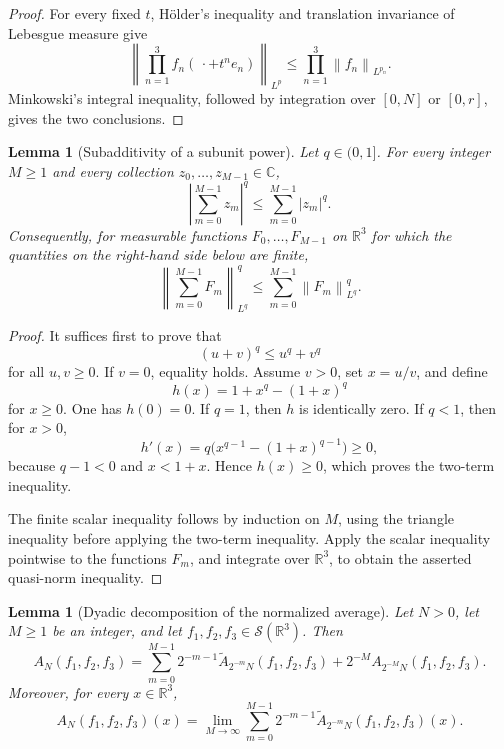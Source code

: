 \documentclass[11pt]{article}
\newtheorem{lemma}[theorem]{Lemma}
\newcommand{\R}{\mathbb{R}}
\newcommand{\Cplx}{\mathbb{C}}
\newcommand{\Sch}{\mathcal{S}}
\newcommand{\norm}[2]{\left\lVert #1\right\rVert_{#2}}
\newcommand{\abs}[1]{\left|#1\right|}
\begin{document}
	\begin{proof}
		For every fixed \(t\), H\"older's inequality and translation invariance of Lebesgue measure give
		\[
		\norm{\prod_{n=1}^{3}f_n(\,\cdot+t^n e_n)}{L^p}
		\leq
		\prod_{n=1}^{3}\norm{f_n}{L^{p_n}}.
		\]
		Minkowski's integral inequality, followed by integration over \([0,N]\) or \([0,r]\), gives the two conclusions.
	\end{proof}
	
	\begin{lemma}[Subadditivity of a subunit power]\label{lem:subunit-power}
		Let \(q\in(0,1]\).  For every integer \(M\geq1\) and every collection \(z_0,\ldots,z_{M-1}\in\Cplx\),
		\[
		\abs{\sum_{m=0}^{M-1}z_m}^{q}
		\leq
		\sum_{m=0}^{M-1}\abs{z_m}^{q}.
		\]
		Consequently, for measurable functions \(F_0,\ldots,F_{M-1}\) on \(\R^3\) for which the quantities on the right-hand side below are finite,
		\[
		\norm{\sum_{m=0}^{M-1}F_m}{L^q}^{q}
		\leq
		\sum_{m=0}^{M-1}\norm{F_m}{L^q}^{q}.
		\]
	\end{lemma}
	
	\begin{proof}
		It suffices first to prove that
		\[
		(u+v)^q\leq u^q+v^q
		\]
		for all \(u,v\geq0\).  If \(v=0\), equality holds.  Assume \(v>0\), set \(x=u/v\), and define
		\[
		h(x)=1+x^q-(1+x)^q
		\]
		for \(x\geq0\).  One has \(h(0)=0\).  If \(q=1\), then \(h\) is identically zero.  If \(q<1\), then for \(x>0\),
		\[
		h'(x)=q\bigl(x^{q-1}-(1+x)^{q-1}\bigr)\geq0,
		\]
		because \(q-1<0\) and \(x<1+x\).  Hence \(h(x)\geq0\), which proves the two-term inequality.
		
		The finite scalar inequality follows by induction on \(M\), using the triangle inequality before applying the two-term inequality.  Apply the scalar inequality pointwise to the functions \(F_m\), and integrate over \(\R^3\), to obtain the asserted quasi-norm inequality.
	\end{proof}
	
	\begin{lemma}[Dyadic decomposition of the normalized average]\label{lem:dyadic-decomposition}
		Let \(N>0\), let \(M\geq1\) be an integer, and let \(f_1,f_2,f_3\in\Sch(\R^3)\).  Then
		\[
		A_N(f_1,f_2,f_3)
		=
		\sum_{m=0}^{M-1}2^{-m-1}\widetilde A_{2^{-m}N}(f_1,f_2,f_3)
		+
		2^{-M}A_{2^{-M}N}(f_1,f_2,f_3).
		\]
		Moreover, for every \(x\in\R^3\),
		\[
		A_N(f_1,f_2,f_3)(x)
		=
		\lim_{M\to\infty}
		\sum_{m=0}^{M-1}2^{-m-1}\widetilde A_{2^{-m}N}(f_1,f_2,f_3)(x).
		\]
	\end{lemma}
	
\end{document}

